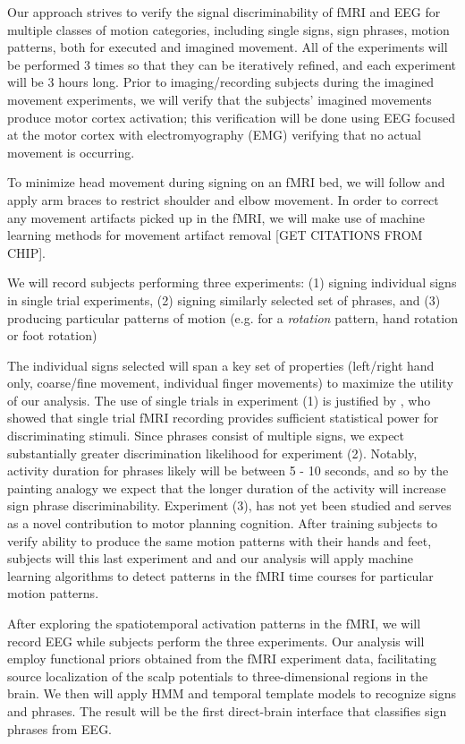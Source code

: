 \documentclass{proposal}
\begin{document}
Our approach strives to verify the signal discriminability of fMRI and EEG for multiple classes of motion categories, including single signs, sign phrases, motion patterns, both for executed and imagined movement. All of the experiments will be performed 3 times so that they can be iteratively refined, and each experiment will be 3 hours long. Prior to imaging/recording subjects during the imagined movement experiments, we will verify that the subjects' imagined movements produce motor cortex activation; this verification will be done using EEG focused at the motor cortex with electromyography (EMG) verifying that no actual movement is occurring.

To minimize head movement during signing on an fMRI bed, we will follow \cite{culham2003vgg} and apply arm braces to restrict shoulder and elbow movement. In order to correct any movement artifacts picked up in the fMRI, we will make use of machine learning methods for movement artifact removal [GET CITATIONS FROM CHIP].

We will record subjects performing three experiments: (1) signing individual signs in single trial experiments, (2) signing similarly selected set of phrases, and (3) producing particular patterns of motion (e.g. for a \textit{rotation} pattern, hand rotation or foot rotation)

The individual signs selected will span a key set of properties (left/right hand only, coarse/fine movement, individual finger movements) to maximize the utility of our analysis. The use of single trials in experiment (1) is justified by \cite{buckner1996dca}, who showed that single trial fMRI recording provides sufficient statistical power for discriminating stimuli. Since phrases consist of multiple signs, we expect substantially greater discrimination likelihood for experiment (2). Notably, activity duration for phrases likely will be between 5 - 10 seconds, and so by the painting analogy we expect that the longer duration of the activity will increase sign phrase discriminability. Experiment (3), has not yet been studied and serves as a novel contribution to motor planning cognition. After training subjects to verify ability to produce the same motion patterns with their hands and feet, subjects will this last experiment and and our analysis will apply machine learning algorithms to detect patterns in the fMRI time courses for particular motion patterns.

After exploring the spatiotemporal activation patterns in the fMRI, we will record EEG while subjects perform the three experiments. Our analysis will employ functional priors obtained from the fMRI experiment data, facilitating source localization of the scalp potentials to three-dimensional regions in the brain. We then will apply HMM and temporal template models to recognize signs and phrases. The result will be the first direct-brain interface that classifies sign phrases from EEG.
\end{document}
